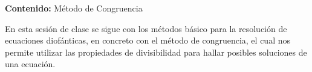 {\Large\textbf{Contenido:} Método de Congruencia}

En esta sesión de clase se sigue con los métodos básico para la resolución de ecuaciones diofánticas, en concreto con
el método de congruencia, el cual nos permite utilizar las propiedades de divisibilidad para hallar posibles soluciones de una ecuación.